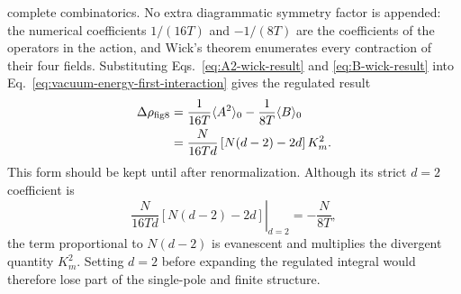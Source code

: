 complete combinatorics.  No extra diagrammatic symmetry factor is appended:
the numerical coefficients $1/(16T)$ and $-1/(8T)$ are the coefficients of
the operators in the action, and Wick's theorem enumerates every contraction
of their four fields.
Substituting Eqs.~\eqref{eq:A2-wick-result} and \eqref{eq:B-wick-result} into
Eq.~\eqref{eq:vacuum-energy-first-interaction} gives the regulated result
\begin{align}
  \Delta\rho_{\mathrm{fig8}}
  &= \frac{1}{16T}\langle A^2\rangle_0
     -\frac{1}{8T}\langle B\rangle_0
  \notag\\
  &= \frac{N}{16Td}
     \left[N(d-2)-2d\right]K_m^2 .
  \label{eq:figure-eight-general-d}
\end{align}
This form should be kept until after renormalization.  Although its strict
$d=2$ coefficient is
\begin{equation}
  \left.\frac{N}{16Td}
  \left[N(d-2)-2d\right]\right|_{d=2}
  = -\frac{N}{8T},
  \label{eq:strict-two-dimensional-coefficient}
\end{equation}
the term proportional to $N(d-2)$ is evanescent and multiplies the divergent
quantity $K_m^2$.  Setting $d=2$ before expanding the regulated integral would
therefore lose part of the single-pole and finite structure.

